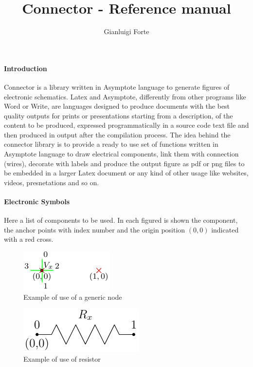 \documentclass[a4paper,12pt]{report}
\title{Connector - Reference manual }
\author{Gianluigi Forte}
\begin{document}
\maketitle

\paragraph{Introduction}

Connector is a library written in Asymptote language to generate figures of electronic schematics. Latex and Asymptote, differently from other programs like Word or Write, are languages designed to produce documents with the best quality outputs for prints or presentations starting from a description, of the content to be produced, expressed programmatically in a source code text file and then produced in output after the compilation process. The idea behind the connector library is to provide a ready to use set of functions written in Asymptote language to draw electrical components, link them with connection (wires), decorate with labels and produce the output figure as pdf or png files to be embedded in a larger Latex document or any kind of other usage like websites, videos, presnetations and so on. 


\paragraph{Electronic Symbols}

Here a list of components to be used. In each figured is shown the component, the anchor points with index number and the origin position $(0,0)$ indicated with a red cross.

\begin{figure}[h]
\centering
\includegraphics{nodeInfo}
\caption{Example of use of a generic node}
\label{nodeInfo} %
\end{figure}


\begin{figure}[h]
\centering
\includegraphics{resistorInfo}
\caption{Example of use of resistor}
\label{resistorInfo} %
\end{figure}
\end{document}
